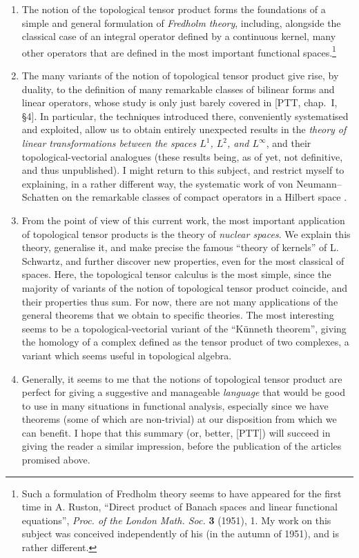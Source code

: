 \documentclass[british]{article}
\begin{document}
\begin{enumerate}
\def\labelenumi{\alph{enumi}.}
\item
  The notion of the topological tensor product forms the foundations of
  a simple and general formulation of \emph{Fredholm theory}, including,
  alongside the classical case of an integral operator defined by a
  continuous kernel, many other operators that are defined in the most
  important functional spaces.\footnote{Such a formulation of Fredholm
    theory seems to have appeared for the first time in A. Ruston,
    ``Direct product of Banach spaces and linear functional equations'',
    \emph{Proc. of the London Math. Soc.} \textbf{3} (1951), 1. My work
    on this subject was conceived independently of his (in the autumn of
    1951), and is rather different.}
\item
  The many variants of the notion of topological tensor product give
  rise, by duality, to the definition of many remarkable classes of
  bilinear forms and linear operators, whose study is only just barely
  covered in {[}PTT, chap.~I, §4{]}. In particular, the techniques
  introduced there, conveniently systematised and exploited, allow us to
  obtain entirely unexpected results in the \emph{theory of linear
  transformations between the spaces \(L^1\), \(L^2\), and
  \(L^\infty\)}, and their topological-vectorial analogues (these
  results being, as of yet, not definitive, and thus unpublished). I
  might return to this subject, and restrict myself to explaining, in a
  rather different way, the systematic work of von Neumann--Schatten on
  the remarkable classes of compact operators in a Hilbert space
  \autocite[chap.~4]{8}.
\item
  From the point of view of this current work, the most important
  application of topological tensor products is the theory of
  \emph{nuclear spaces}. We explain this theory, generalise it, and make
  precise the famous ``theory of kernels'' of L. Schwartz, and further
  discover new properties, even for the most classical of spaces. Here,
  the topological tensor calculus is the most simple, since the majority
  of variants of the notion of topological tensor product coincide, and
  their properties thus sum. For now, there are not many applications of
  the general theorems that we obtain to specific theories. The most
  interesting seems to be a topological-vectorial variant of the
  ``Künneth theorem'', giving the homology of a complex defined as the
  tensor product of two complexes, a variant which seems useful in
  topological algebra.
\item
  Generally, it seems to me that the notions of topological tensor
  product are perfect for giving a suggestive and manageable
  \emph{language} that would be good to use in many situations in
  functional analysis, especially since we have theorems (some of which
  are non-trivial) at our disposition from which we can benefit. I hope
  that this summary (or, better, {[}PTT{]}) will succeed in giving the
  reader a similar impression, before the publication of the articles
  promised above.
\end{enumerate}
\end{document}

